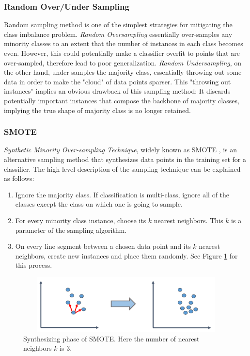 \documentclass{article}
\begin{document}
		\subsubsection{Random Over/Under Sampling}
		Random sampling method is one of the simplest strategies for mitigating the class imbalance problem. \textit{Random Oversampling} essentially over-samples any minority classes to an extent that the number of instances in each class becomes even. However, this could potentially make a classifier overfit to points that are over-sampled, therefore lead to poor generalization. \textit{Random Undersampling}, on the other hand, under-samples the majority class, essentially throwing out some data in order to make the "cloud" of data points sparser. This "throwing out instances" implies an obvious drawback of this sampling method: It discards potentially important instances that compose the backbone of majority classes, implying the true shape of majority class is no longer retained.
		
		\subsubsection{SMOTE}
		\textit{Synthetic Minority Over-sampling Technique}, widely known as SMOTE \cite{SMOTE}, is an alternative sampling method that synthesizes data points in the training set for a classifier. The high level description of the sampling technique can be explained as follows:
		
		\begin{enumerate}
			\item Ignore the majority class. If classification is multi-class, ignore all of the classes except the class on which one is going to sample.
			\item For every minority class instance, choose its $k$ nearest neighbors. This $k$ is a parameter of the sampling algorithm.
			\item On every line segment between a chosen data point and its  $k$ nearest neighbors, create new instances and place them randomly. See Figure \ref{smote} for this process.
		\end{enumerate}
		
		\begin{figure}[ht]
		\begin{center}
		\vspace{0.5cm}
		\includegraphics[clip,width=12cm,height = 3cm]{figs/SMOTE.png}
		\vspace{0.5cm}
		\caption{Synthesizing phase of SMOTE. Here the number of nearest neighbors $k$ is 3.}
		\label{smote}
		\end{center}
		\end{figure}
\end{document}
